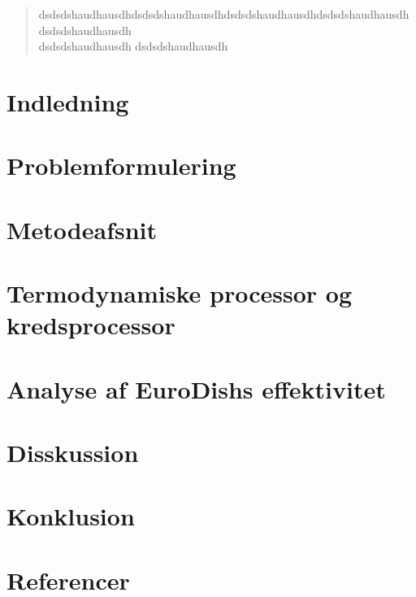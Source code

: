 \documentclass[12pt,a4paper]{article}
\author{Christian Kaae Larsen}
\begin{document}
	\tableofcontents
	
	\begin{abstract}
		dsdsdshaudhausdhdsdsdshaudhausdhdsdsdshaudhausdhdsdsdshaudhausdh
		dsdsdshaudhausdh\\
		dsdsdshaudhausdh
		dsdsdshaudhausdh
	\end{abstract}
	
	\section{Indledning}
	

	\section{Problemformulering}
	
	
	\section{Metodeafsnit} %
	
	
	\section{Termodynamiske processor og kredsprocessor}
	
	
	\section{Analyse af EuroDishs effektivitet}
	
	
	\section{Disskussion}
	
	
	\section{Konklusion}
	
	
	\section{Referencer}
	
		
	
	
	
			
			
			
			
			
			
\end{document}
